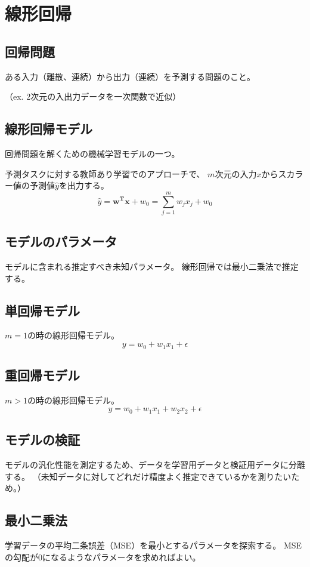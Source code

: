 \documentclass[b5paper,12pt]{jarticle}
\begin{document}
\section{線形回帰}

\subsection{回帰問題}
ある入力（離散、連続）から出力（連続）を予測する問題のこと。

（ex. 2次元の入出力データを一次関数で近似）

\subsection{線形回帰モデル}
回帰問題を解くための機械学習モデルの一つ。

予測タスクに対する教師あり学習でのアプローチで、
$m$次元の入力$x$からスカラー値の予測値$\hat{y}$を出力する。
\[
    \hat{y}=\boldsymbol{w^T x}+ w_0 = \sum_{j=1}^{m}w_j x_j + w_0
\]

\subsection{モデルのパラメータ}
モデルに含まれる推定すべき未知パラメータ。
線形回帰では最小二乗法で推定する。

\subsection{単回帰モデル}
$m = 1$の時の線形回帰モデル。
\[
  y = w_0 + w_1 x_1+ \epsilon
\]

\subsection{重回帰モデル}
$m > 1$の時の線形回帰モデル。
\[
  y = w_0 + w_1 x_1 + w_2 x_2+ \epsilon
\]

\subsection{モデルの検証}
モデルの汎化性能を測定するため、データを学習用データと検証用データに分離する。
（未知データに対してどれだけ精度よく推定できているかを測りたいため。）

\subsection{最小二乗法}
学習データの平均二条誤差（MSE）を最小とするパラメータを探索する。
MSEの勾配が0になるようなパラメータを求めればよい。
\end{document}
